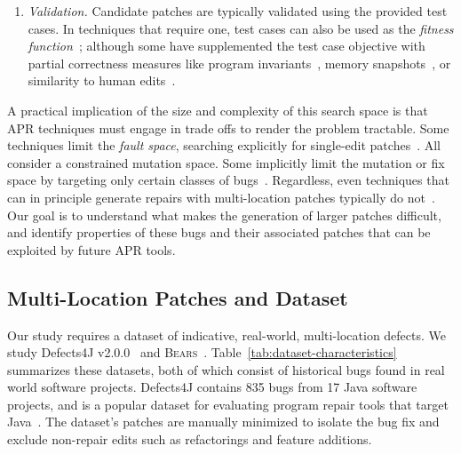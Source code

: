 \documentclass[10pt,journal,compsoc]{IEEEtran}
\newcommand\bears{\textsc{Bears}\xspace}
\begin{document}
\begin{enumerate}[wide]
\item \emph {Validation.}
Candidate patches are typically
validated using the provided test cases. In techniques
that require one, test cases can also be used as the \emph{fitness
  function}~\cite{genprog}; although some have supplemented the test case
objective with partial correctness measures like program
invariants~\cite{dinglyu}, memory snapshots~\cite{source-code-checkpoint}, or
similarity to human edits~\cite{hdrepair}.

\end{enumerate}

A practical implication of the size and complexity of this search space is
that APR techniques must engage in trade offs to render the problem tractable. 
Some techniques limit the \emph{fault space},
searching explicitly for single-edit patches~\cite{rsrepair,ae,hdrepair,capgen}.
All consider a constrained mutation space. 
Some implicitly limit the mutation or fix space by targeting only certain
classes of bugs~\cite{Xuan17,sapfix,DeMarco14,par}. Regardless, even techniques
that can in principle generate repairs with multi-location patches typically
do not~\cite{patch-correctness}.
%
%
Our goal is to understand what makes the generation of larger
patches difficult, and identify properties of these bugs and their associated
patches that can be exploited by future APR tools.  

\subsection{Multi-Location Patches and Dataset}
\label{sec:bugs}

Our study requires a dataset of indicative, real-world,
multi-location defects.  We study 
Defects4J v2.0.0~\cite{defects4j} and \bears~\cite{bears}.  Table~\ref{tab:dataset-characteristics}
summarizes these datasets, both of which
consist of historical
bugs found in real world software projects. Defects4J contains 835 bugs from 
17 Java software projects, and is a popular dataset for evaluating 
program repair tools that target 
Java~\cite{durieux-repair-them-all,pearson2017evaluating,saha2017elixir,saha2019harnessing,xin2017leveraging,b2016learning}.
The dataset's patches are manually minimized to isolate the bug fix 
and exclude non-repair edits such as refactorings and feature additions.
\end{document}
